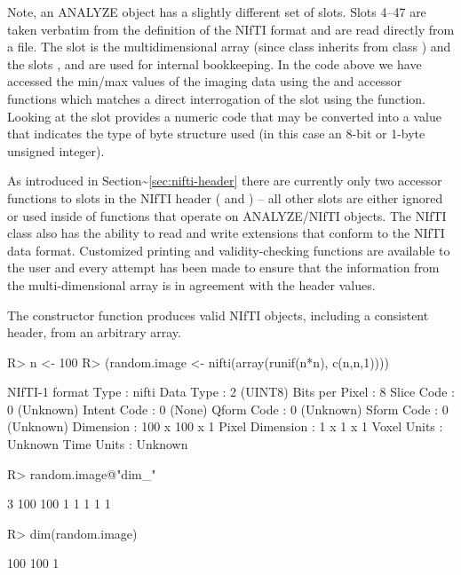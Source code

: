\documentclass[
]{jss}
\begin{document}
Note, an ANALYZE object has a slightly different set of slots. Slots
4--47 are taken verbatim from the definition of the NIfTI format and are
read directly from a file. The slot  is the multidimensional
array (since class  inherits from class ) and
the slots ,  and  are used
for internal bookkeeping. In the code above we have accessed the min/max
values of the imaging data using the  and 
accessor functions which matches a direct interrogation of the
 slot using the  function. Looking at the
 slot provides a numeric code that may be converted into
a value that indicates the type of byte structure used (in this case an
8-bit or 1-byte unsigned integer).

As introduced in Section\textasciitilde{}\ref{sec:nifti-header} there
are currently only two accessor functions to slots in the NIfTI header
( and ) -- all other slots are either
ignored or used inside of functions that operate on ANALYZE/NIfTI
objects. The NIfTI class also has the ability to read and write
extensions that conform to the NIfTI data format. Customized printing
and validity-checking functions are available to the user and every
attempt has been made to ensure that the information from the
multi-dimensional array is in agreement with the header values.

The constructor function  produces valid NIfTI objects,
including a consistent header, from an arbitrary array.

\begin{CodeChunk}

\begin{CodeInput}
R> n <- 100
R> (random.image <- nifti(array(runif(n*n), c(n,n,1))))
\end{CodeInput}

\begin{CodeOutput}
NIfTI-1 format
  Type            : nifti
  Data Type       : 2 (UINT8)
  Bits per Pixel  : 8
  Slice Code      : 0 (Unknown)
  Intent Code     : 0 (None)
  Qform Code      : 0 (Unknown)
  Sform Code      : 0 (Unknown)
  Dimension       : 100 x 100 x 1
  Pixel Dimension : 1 x 1 x 1
  Voxel Units     : Unknown
  Time Units      : Unknown
\end{CodeOutput}

\begin{CodeInput}
R> random.image@"dim_"
\end{CodeInput}

\begin{CodeOutput}
[1]   3 100 100   1   1   1   1   1
\end{CodeOutput}

\begin{CodeInput}
R> dim(random.image)
\end{CodeInput}

\begin{CodeOutput}
[1] 100 100   1
\end{CodeOutput}
\end{CodeChunk}
\end{document}

